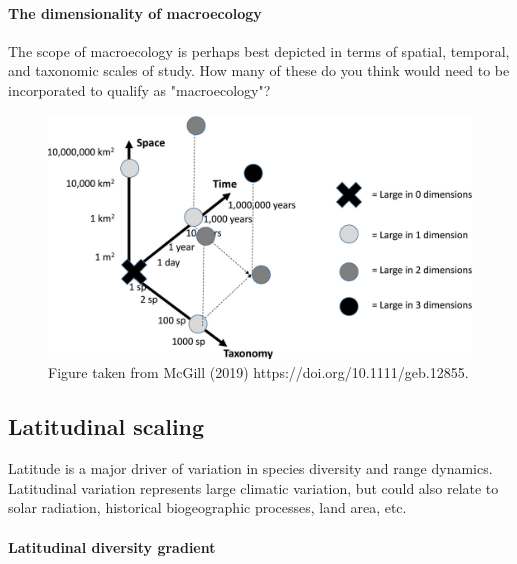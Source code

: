 \documentclass[12pt]{article}
\begin{document}
\paragraph*{The dimensionality of macroecology}

The scope of macroecology is perhaps best depicted in terms of spatial, temporal, and taxonomic scales of study. How many of these do you think would need to be incorporated to qualify as "macroecology"?

\begin{figure}
\includegraphics[width=\textwidth]{figs/macro.jpg}
\caption{Figure taken from McGill (2019) https://doi.org/10.1111/geb.12855.}
\end{figure}
















\bigskip

\subsection*{Latitudinal scaling}

Latitude is a major driver of variation in species diversity and range dynamics. Latitudinal variation represents large climatic variation, but could also relate to solar radiation, historical biogeographic processes, land area, etc.



\bigskip




\paragraph*{Latitudinal diversity gradient}
\end{document}
